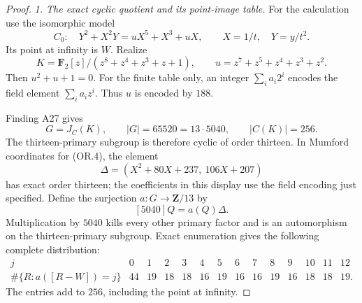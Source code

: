 \documentclass[11pt,a4paper]{article}
\begin{document}
\begin{proof}
\emph{1. The exact cyclic quotient and its point-image table.}
For the calculation use the isomorphic model
\[
 C_0:\quad Y^2+X^2Y=uX^5+X^3+uX,
 \qquad X=1/t,\quad Y=y/t^2.
 \tag{OR.4}
\]
Its point at infinity is $W$.  Realize
\[
 K=\mathbf F_2[z]/(z^8+z^4+z^3+z+1),\qquad
 u=z^7+z^5+z^4+z^3+z^2.
 \tag{OR.5}
\]
Then $u^2+u+1=0$.  For the finite table only, an integer
$\sum_i a_i2^i$ encodes the field element $\sum_i a_iz^i$.
Thus $u$ is encoded by $188$.

Finding A27 gives
\[
        G=J_C(K),\qquad |G|=65520=13\cdot5040,
        \qquad |C(K)|=256.
 \tag{OR.6}
\]
The thirteen-primary subgroup is therefore cyclic of order
thirteen.  In Mumford coordinates for (OR.4), the element
\[
        \Delta=(X^2+80X+237,\ 106X+207)
 \tag{OR.7}
\]
has exact order thirteen; the coefficients in this display use
the field encoding just specified.  Define the surjection
$a:G\to\mathbf Z/13$ by
\[
                      [5040]Q=a(Q)\Delta.
 \tag{OR.8}
\]
Multiplication by $5040$ kills every other primary factor and
is an automorphism on the thirteen-primary subgroup.  Exact
enumeration gives the following complete distribution:
\[
\begin{array}{c|rrrrrrrrrrrrr}
 j&0&1&2&3&4&5&6&7&8&9&10&11&12\\ \hline
 \#\{R:a([R-W])=j\}
 &44&19&18&18&16&19&16&16&19&16&18&18&19.
\end{array}
 \tag{OR.9}
\]
The entries add to $256$, including the point at infinity.


\end{proof}
\end{document}
